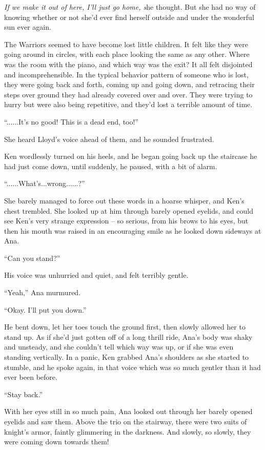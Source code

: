 \documentclass[
]{article}
\begin{document}
\emph{If we make it out of here, I'll just go home, s}he thought. But
she had no way of knowing whether or not she'd ever find herself outside
and under the wonderful sun ever again.

The Warriors seemed to have become lost little children. It felt like
they were going around in circles, with each place looking the same as
any other. Where was the room with the piano, and which way was the
exit? It all felt disjointed and incomprehensible. In the typical
behavior pattern of someone who is lost, they were going back and forth,
coming up and going down, and retracing their steps over ground they had
already covered over and over. They were trying to hurry but were also
being repetitive, and they'd lost a terrible amount of time.

``......It's no good! This is a dead end, too!''

She heard Lloyd's voice ahead of them, and he sounded frustrated.

Ken wordlessly turned on his heels, and he began going back up the
staircase he had just come down, until suddenly, he paused, with a bit
of alarm.

``......What's...wrong......?''

She barely managed to force out these words in a hoarse whisper, and
Ken's chest trembled. She looked up at him through barely opened
eyelids, and could see Ken's very strange expression -- so serious, from
his brows to his eyes, but then his mouth was raised in an encouraging
smile as he looked down sideways at Ana.

``Can you stand?''

His voice was unhurried and quiet, and felt terribly gentle.

``Yeah,'' Ana murmured.

``Okay. I'll put you down.''

He bent down, let her toes touch the ground first, then slowly allowed
her to stand up. As if she'd just gotten off of a long thrill ride,
Ana's body was shaky and unsteady, and she couldn't tell which way was
up, or if she was even standing vertically. In a panic, Ken grabbed
Ana's shoulders as she started to stumble, and he spoke again, in that
voice which was so much gentler than it had ever been before.

``Stay back.''

With her eyes still in so much pain, Ana looked out through her barely
opened eyelids and saw them. Above the trio on the stairway, there were
two suits of knight's armor, faintly glimmering in the darkness. And
slowly, so slowly, they were coming down towards them!
\end{document}
